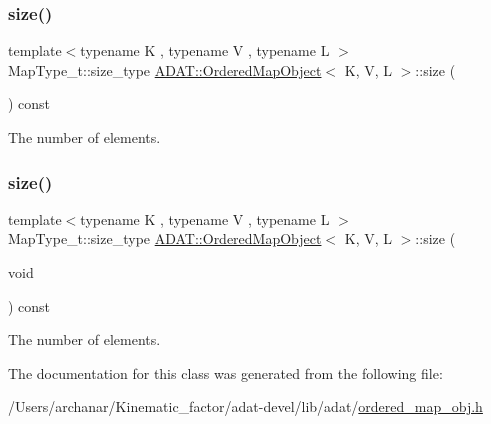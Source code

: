 \subsubsection{\texorpdfstring{size()}{size()}\hspace{0.1cm}{\footnotesize\ttfamily [1/2]}}
{\footnotesize\ttfamily template$<$typename K , typename V , typename L $>$ \\
Map\+Type\+\_\+t\+::size\+\_\+type \mbox{\hyperlink{classADAT_1_1OrderedMapObject}{A\+D\+A\+T\+::\+Ordered\+Map\+Object}}$<$ K, V, L $>$\+::size (\begin{DoxyParamCaption}{ }\end{DoxyParamCaption}) const\hspace{0.3cm}{\ttfamily [inline]}}



The number of elements. 

\mbox{\label{classADAT_1_1OrderedMapObject_a3d96d76de0ad61fb858509543c3f60f4}} 
\subsubsection{\texorpdfstring{size()}{size()}\hspace{0.1cm}{\footnotesize\ttfamily [2/2]}}
{\footnotesize\ttfamily template$<$typename K , typename V , typename L $>$ \\
Map\+Type\+\_\+t\+::size\+\_\+type \mbox{\hyperlink{classADAT_1_1OrderedMapObject}{A\+D\+A\+T\+::\+Ordered\+Map\+Object}}$<$ K, V, L $>$\+::size (\begin{DoxyParamCaption}\item[{void}]{ }\end{DoxyParamCaption}) const\hspace{0.3cm}{\ttfamily [inline]}}



The number of elements. 



The documentation for this class was generated from the following file\+:\begin{DoxyCompactItemize}
\item 
/\+Users/archanar/\+Kinematic\+\_\+factor/adat-\/devel/lib/adat/\mbox{\hyperlink{adat-devel_2lib_2adat_2ordered__map__obj_8h}{ordered\+\_\+map\+\_\+obj.\+h}}\end{DoxyCompactItemize}
